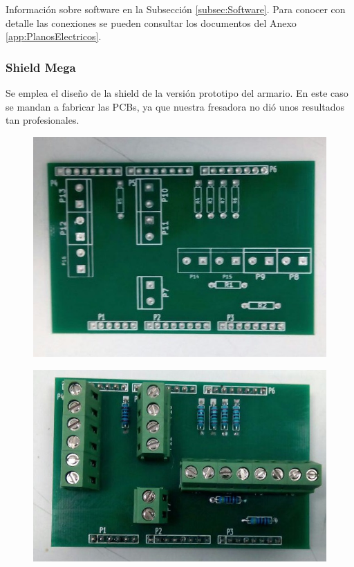 Información sobre software en la Subsección \ref{subsec:Software}. Para conocer con detalle las conexiones se pueden consultar los documentos del Anexo \ref{app:PlanosElectricos}.

\subsubsection{Shield Mega}
Se emplea el diseño de la shield de la versión prototipo del armario. En este caso se mandan a fabricar las PCBs, ya que nuestra fresadora no dió unos resultados tan profesionales.

\begin{figure}
\centering
\begin{minipage}{.5\textwidth}
  \centering
  \includegraphics[width=.9\textwidth]{Figures/pcbMega}
  \label{fig:pcbdMega}
\end{minipage}%
\begin{minipage}{.5\textwidth}
  \centering
  \includegraphics[width=.9\textwidth]{Figures/shieldMega}
  \label{fig:shieldMega}
\end{minipage}
\end{figure}

